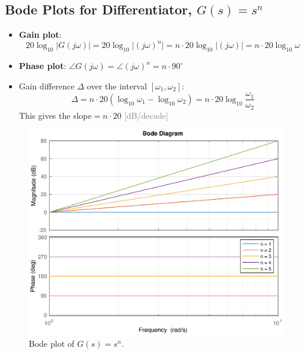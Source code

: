 \documentclass[12pt,a4paper]{article}
\begin{document}
\subsection{Bode Plots for Differentiator, $G(s) = s^{n}$}
\begin{itemize}
\item \textbf{Gain plot}: \[20\log_{10}\lvert G(j\omega) \rvert  = 20\log_{10}\lvert (j\omega)^{n} \rvert = n\cdot 20\log_{10}\lvert (j\omega) \rvert=\boxed{n\cdot20\log_{10}\omega}\]
\item \textbf{Phase plot}: $\angle G(j\omega) = \angle (j\omega)^{n} = \boxed{n\cdot 90^{\circ}}$
\item Gain difference $\Delta$ over the interval $[\omega_{1}, \omega_{2}] $: \[ \Delta = n\cdot20(\log_{10}\omega_{1}-\log_{10}\omega_{2})=\boxed{n\cdot20 \log_{10}\frac{\omega_{1}}{\omega_{2}}}\]
This gives the slope$=n\cdot 20$ \textcolor{gray}{[dB/decade]}
\end{itemize}
\vspace{-.9cm}
\begin{figure}[H] \centering 
\includegraphics[width=.7\textwidth]{images/bode_4.eps}
\caption{Bode plot of $G(s) = s^{n}$.}
\end{figure}
\end{document}
